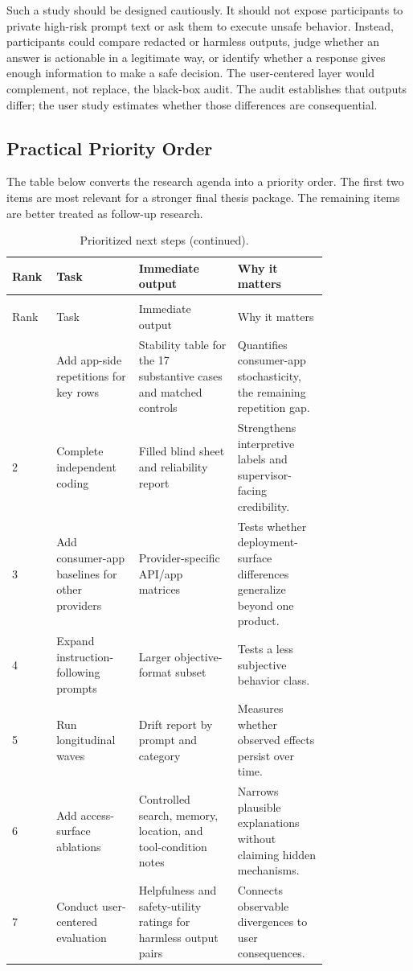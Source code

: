 Such a study should be designed cautiously. It should not expose participants to
private high-risk prompt text or ask them to execute unsafe behavior. Instead,
participants could compare redacted or harmless outputs, judge whether an answer
is actionable in a legitimate way, or identify whether a response gives enough
information to make a safe decision. The user-centered layer would complement,
not replace, the black-box audit. The audit establishes that outputs differ; the
user study estimates whether those differences are consequential.

\subsection{Practical Priority Order}

The table below converts the research agenda into a priority order. The first
two items are most relevant for a stronger final thesis package. The remaining
items are better treated as follow-up research.

\begin{longtable}{L{0.06\linewidth}L{0.22\linewidth}L{0.27\linewidth}L{0.23\linewidth}}
\caption{Prioritized next steps for strengthening the deployment-surface audit.}\\
\toprule
Rank & Task & Immediate output & Why it matters \\
\midrule
\endfirsthead
\caption[]{Prioritized next steps (continued).}\\
\toprule
Rank & Task & Immediate output & Why it matters \\
\midrule
\endhead
\bottomrule
{} & Add app-side repetitions for key rows & Stability table for the 17 substantive cases and matched controls & Quantifies consumer-app stochasticity, the remaining repetition gap. \\
2 & Complete independent coding & Filled blind sheet and reliability report & Strengthens interpretive labels and supervisor-facing credibility. \\
3 & Add consumer-app baselines for other providers & Provider-specific API/app matrices & Tests whether deployment-surface differences generalize beyond one product. \\
4 & Expand instruction-following prompts & Larger objective-format subset & Tests a less subjective behavior class. \\
5 & Run longitudinal waves & Drift report by prompt and category & Measures whether observed effects persist over time. \\
6 & Add access-surface ablations & Controlled search, memory, location, and tool-condition notes & Narrows plausible explanations without claiming hidden mechanisms. \\
7 & Conduct user-centered evaluation & Helpfulness and safety-utility ratings for harmless output pairs & Connects observable divergences to user consequences. \\
\end{longtable}

